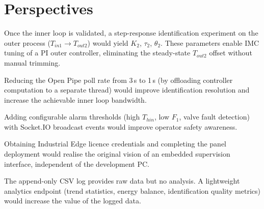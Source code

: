 \section{Perspectives}
\label{sec:perspectives}

\begin{description}[leftmargin=2cm, style=nextline, itemsep=6pt]

  \item[Outer loop PI upgrade]
    Once the inner loop is validated, a step-response identification experiment on the
    outer process ($T_{in1} \rightarrow T_{out2}$) would yield $K_2$, $\tau_2$, $\theta_2$.
    These parameters enable IMC tuning of a PI outer controller, eliminating the
    steady-state $T_{out2}$ offset without manual trimming.

  \item[Faster sampling]
    Reducing the Open Pipe poll rate from 3\,s to 1\,s (by offloading controller
    computation to a separate thread) would improve identification resolution and increase
    the achievable inner loop bandwidth.

  \item[Alarm management]
    Adding configurable alarm thresholds (high $T_{hin}$, low $F_1$, valve fault detection)
    with Socket.IO broadcast events would improve operator safety awareness.

  \item[Complete Industrial Edge deployment]
    Obtaining Industrial Edge licence credentials and completing the panel deployment would
    realise the original vision of an embedded supervision interface, independent of the
    development PC.

  \item[Data analytics]
    The append-only CSV log provides raw data but no analysis. A lightweight analytics
    endpoint (trend statistics, energy balance, identification quality metrics) would
    increase the value of the logged data.

\end{description}
